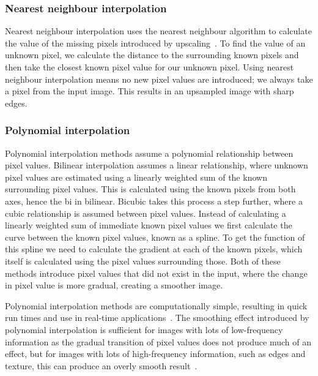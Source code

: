 \subsubsection{Nearest neighbour interpolation}
Nearest neighbour interpolation uses the nearest neighbour algorithm to calculate the value of the missing pixels introduced by upscaling~\cite{nnInterpolation}. To find the value of an unknown pixel, we calculate the distance to the surrounding known pixels and then take the closest known pixel value for our unknown pixel. Using nearest neighbour interpolation means no new pixel values are introduced; we always take a pixel from the input image. This results in an upsampled image with sharp edges.

\subsubsection{Polynomial interpolation}
Polynomial interpolation methods assume a polynomial relationship between pixel values. Bilinear interpolation assumes a linear relationship, where unknown pixel values are estimated using a linearly weighted sum of the known surrounding pixel values. This is calculated using the known pixels from both axes, hence the bi in bilinear. Bicubic takes this process a step further, where a cubic relationship is assumed between pixel values. Instead of calculating a linearly weighted sum of immediate known pixel values we first calculate the curve between the known pixel values, known as a spline. To get the function of this spline we need to calculate the gradient at each of the known pixels, which itself is calculated using the pixel values surrounding those. Both of these methods introduce pixel values that did not exist in the input, where the change in pixel value is more gradual, creating a smoother image.

Polynomial interpolation methods are computationally simple, resulting in quick run times and use in real-time applications~\cite{interpolation}. The smoothing effect introduced by polynomial interpolation is sufficient for images with lots of low-frequency information as the gradual transition of pixel values does not produce much of an effect, but for images with lots of high-frequency information, such as edges and texture, this can produce an overly smooth result~\cite{interpolation}.

